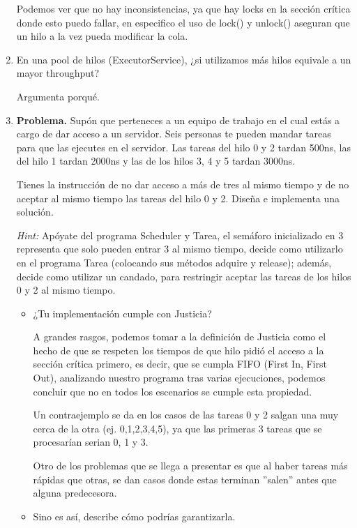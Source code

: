 \begin{enumerate}
Podemos ver que no hay inconsistencias, ya que hay locks en la sección crítica donde esto puedo fallar, en especifico el uso de lock()  y unlock() aseguran que un hilo a la vez pueda modificar la cola.
\hfill

\hfill

\item En una pool de hilos (ExecutorService), ¿si utilizamos más hilos equivale a un mayor throughput?

Argumenta porqué.

\hfill

\item \textbf{Problema.} Supón que perteneces a un equipo de trabajo en el cual estás a cargo de dar acceso a un servidor. Seis personas te pueden mandar tareas para que las ejecutes en el servidor. Las tareas del hilo 0 y 2 tardan 500ns, las del hilo 1 tardan 2000ns y las de los hilos 3, 4 y 5 tardan 3000ns.

Tienes la instrucción de no dar acceso a más de tres al mismo tiempo y de no aceptar al mismo tiempo las tareas del hilo 0 y 2. Diseña e implementa una solución. 

\textit{Hint:} Apóyate del programa Scheduler y Tarea, el semáforo inicializado en 3 representa que solo pueden entrar 3 al mismo tiempo, decide como utilizarlo en el programa Tarea (colocando sus métodos adquire y release); además, decide como utilizar un candado, para restringir aceptar las tareas de los hilos 0 y 2 al mismo tiempo.

\begin{itemize}
    \item ¿Tu implementación cumple con Justicia?

    A grandes rasgos, podemos tomar a la definición de Justicia como el hecho de que se respeten los tiempos de que hilo pidió el acceso a la sección crítica primero, es decir, que se cumpla FIFO (First In, First Out), analizando nuestro programa tras varias ejecuciones, podemos concluir que no en todos los escenarios se cumple esta propiedad.
    
    Un contraejemplo se da en los casos de las tareas 0 y 2 salgan una muy cerca de la otra (ej. 0,1,2,3,4,5), ya que las primeras 3 tareas que se procesarían serian 0, 1 y 3. 

    Otro de los problemas que se llega a presentar es que al haber tareas más rápidas que otras, se dan casos donde estas terminan ''salen'' antes que alguna predecesora.

    \item Sino es así, describe cómo podrías garantizarla.


\end{itemize}
\end{enumerate}
